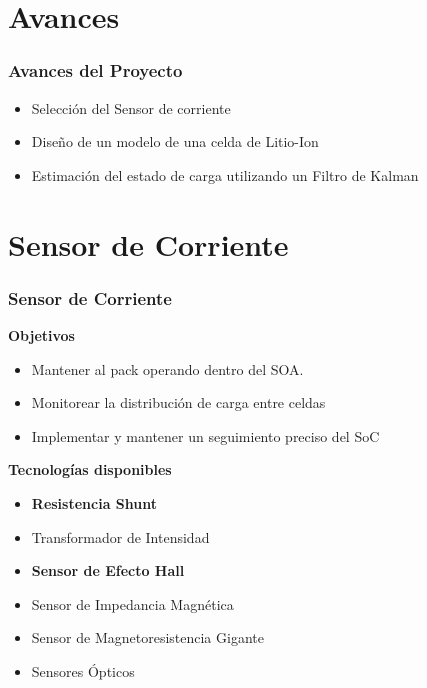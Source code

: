 \documentclass[10pt]{beamer}
\theoremstyle{remark}
\theoremstyle{definition}
\begin{document}
\section{Avances}
\begin{frame}[allowframebreaks]
  	\frametitle{Avances del Proyecto}
  	\begin{itemize}
		\item Selección del Sensor de corriente
		\item Diseño de un modelo de una celda de Litio-Ion
		\item Estimación del estado de carga utilizando un Filtro de Kalman
  	\end{itemize}
\end{frame}

\section{Sensor de Corriente}

\begin{frame}[allowframebreaks]
	\frametitle{Sensor de Corriente}
  	\begin{minipage}{0.4\textwidth}
		\textbf{Objetivos}
		\small
		\begin{itemize}
	  		\item Mantener al pack operando dentro del SOA.
	  		\item Monitorear la distribución de carga entre celdas
	  		\item Implementar y mantener un seguimiento preciso del SoC
	  		\vspace{4\baselineskip}
		\end{itemize}
 	 \end{minipage}
  	\hfill
  	\begin{minipage}{0.4\textwidth}
		\textbf{Tecnologías disponibles}
		\small
		\begin{itemize}
	 		\item \textbf{Resistencia Shunt}
	  		\item Transformador de Intensidad
	  		\item \textbf{Sensor de Efecto Hall}
	  		\item Sensor de Impedancia Magnética
	  		\item Sensor de Magnetoresistencia Gigante
	  		\item Sensores Ópticos
		\end{itemize}
  	\end{minipage}
\end{frame}
\end{document}
